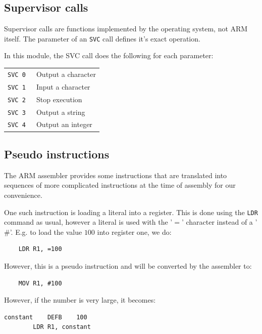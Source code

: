 \documentclass{article}
\begin{document}
\subsection{Supervisor calls}

Supervisor calls are functions implemented by the operating system, not ARM itself. The parameter of an {\tt SVC} call defines it's exact operation.

In this module, the SVC call does the following for each parameter:

\begin{tabularx}{\textwidth}{l X}
	{\tt SVC 0 } & Output a character \\
	{\tt SVC 1 } & Input a character \\
	{\tt SVC 2 } & Stop execution \\
	{\tt SVC 3 } & Output a string \\
	{\tt SVC 4 } & Output an integer \\
\end{tabularx}

\subsection{Pseudo instructions}

The ARM assembler provides some instructions that are translated into sequences of more complicated instructions at the time of assembly for our convenience.

One such instruction is loading a literal into a register. This is done using the {\tt LDR} command as usual, however a literal is used with the '$=$' character instead of a '$\#$'. E.g. to load the value $100$ into register one, we do:

\begin{verbatim}
	LDR	R1,	=100
\end{verbatim}

However, this is a pseudo instruction and will be converted by the assembler to:

\begin{verbatim}
	MOV	R1,	#100
\end{verbatim}

However, if the number is very large, it becomes:

\begin{verbatim}
constant	DEFB	100
		LDR	R1, constant
\end{verbatim}
\end{document}
